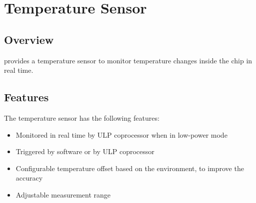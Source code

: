 \documentclass[main\_\_EN.tex]{subfiles}
\begin{document}
\section{Temperature Sensor}\label{sec:tsensor}
\subsection{Overview}

\chipname{} provides a temperature sensor to monitor temperature changes inside the chip in real time.

\subsection{Features}
The temperature sensor has the following features:
\begin{itemize}
    \item Monitored in real time by ULP coprocessor when in low-power mode
    \item Triggered by software or by ULP coprocessor
    \item Configurable temperature offset based on the environment, to improve the accuracy
    \item Adjustable measurement range
\end{itemize}
\end{document}
